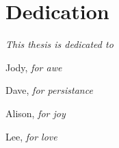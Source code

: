 
\chapter{Dedication}

{\Large {\it This thesis is dedicated to}
\vspace{0.2in}

\noindent\hspace{1in} Jody, {\it for awe}

\noindent\hspace{1in} Dave, {\it for persistance}

\noindent\hspace{1in} Alison, {\it for joy}

\noindent\hspace{1in} Lee, {\it for love}

}